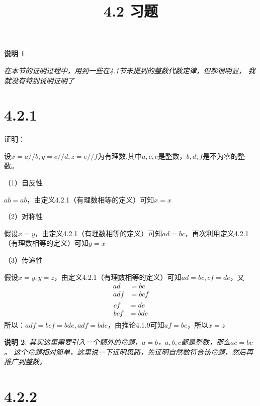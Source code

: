 \documentclass{article}
\theoremstyle{mystyle}
\newtheorem*{zremark}{说明}
\begin{document}
\title{4.2 习题}
\maketitle

\begin{zremark}
  \begin{zgraytheorem}
    在本节的证明过程中，用到一些在4.1节未提到的整数代数定律，但都很明显，
    我就没有特别说明证明了
  \end{zgraytheorem}
\end{zremark}

\section*{4.2.1}

证明：

设$x=a//b,y=c//d,z=e//f$为有理数,其中$a,c,e$是整数，$b,d,f$是不为零的整数。

（1）自反性

$ab=ab$，由定义4.2.1（有理数相等的定义）可知$x=x$

（2）对称性

假设$x=y$，由定义4.2.1（有理数相等的定义）可知$ad=bc$，再次利用定义4.2.1（有理数相等的定义）可知$y=x$

（3）传递性

假设$x=y,y=z$，由定义4.2.1（有理数相等的定义）可知$ad=bc,cf=de$，又
\begin{align*}
  ad  & = bc  \\
  adf & = bcf \\
\end{align*}
\begin{align*}
  cf  & = de  \\
  bcf & = bde \\
\end{align*}
所以：$adf = bcf = bde, adf = bde$，由推论4.1.9可知$af=be$，所以$x=z$

\begin{zgraytheorem}
  \begin{zremark}
    其实这里需要引入一个额外的命题，$a=b$，$a,b,c$都是整数，那么$ac=bc$。
    这个命题相对简单，这里说一下证明思路，先证明自然数符合该命题，然后再推广到整数。
  \end{zremark}
\end{zgraytheorem}

\section*{4.2.2}
\end{document}
